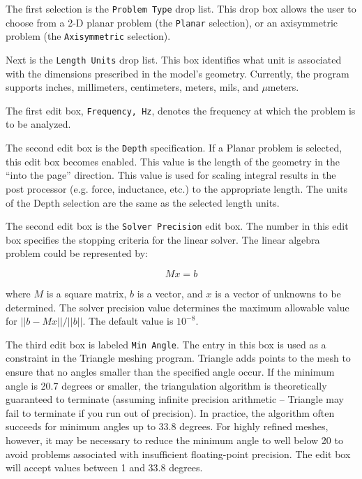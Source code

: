 The first selection is the \texttt{Problem Type} drop list. This
drop box allows the user to choose from a 2-D planar problem (the
\texttt{Planar} selection), or an axisymmetric problem (the
\texttt{Axisymmetric} selection).

Next is the \texttt{Length Units} drop list. This box identifies
what unit is associated with the dimensions prescribed in the
model's geometry. Currently, the program supports inches,
millimeters, centimeters, meters, mils, and $\mu $meters.

The first edit box, {\tt Frequency, Hz}, denotes the frequency at 
which the problem is to be analyzed. 

The second edit box is the \texttt{Depth} specification. If a Planar
problem is selected, this edit box becomes enabled. This value is
the length of the geometry in the ``into the page'' direction. This
value is used for scaling integral results in the post processor
(e.g. force, inductance, etc.) to the appropriate length. The units
of the Depth selection are the same as the selected length units.

The second edit box is the \texttt{Solver Precision} edit box. The
number in this edit box specifies the stopping criteria for the
linear solver. The linear algebra problem could be represented by:

\begin{equation}
M x = b
\end{equation}

\noindent
where $M$ is a square matrix, $b$ is a vector, and $x$ is a vector of
unknowns to be determined. The solver precision value determines the maximum
allowable value for $\vert \vert b - Mx\vert \vert / \vert \vert b\vert
\vert $. The default value is $10^{ - 8}$.

The third edit box is labeled {\tt Min Angle}.  The entry in this box is used as a
constraint in the Triangle meshing program.  Triangle adds points to the mesh to
ensure that no angles smaller than the specified angle occur. If the minimum angle
is 20.7 degrees or smaller, the triangulation algorithm is theoretically guaranteed to
terminate (assuming infinite precision arithmetic -- Triangle may
fail to terminate if you run out of precision).  In practice, the
algorithm often succeeds for minimum angles up to 33.8 degrees.
For highly refined meshes, however, it may be necessary to reduce
the minimum angle to well below 20 to avoid problems associated
with insufficient floating-point precision.  The edit box will accept
values between 1 and 33.8 degrees.


